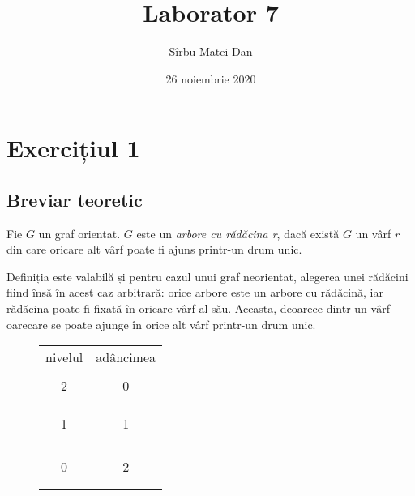 \documentclass[9pt,a4paper]{article}
\title{\bf Laborator 7}
\author{Sîrbu Matei-Dan}
\date{26 noiembrie 2020}
\begin{document}
\maketitle

\section*{Exercițiul 1}
\subsection*{Breviar teoretic}

{\color{black}Fie $G$ un graf orientat. $G$ este un \textit{arbore cu rădăcina r}, dacă există $G$ un vârf $r$ din care oricare alt vârf poate fi ajuns printr-un drum unic.

Definiția este valabilă și pentru cazul unui graf neorientat, alegerea unei rădăcini fiind însă în acest caz arbitrară: orice arbore este un arbore cu rădăcină, iar rădăcina poate fi fixată în oricare vârf al său. Aceasta, deoarece dintr-un vârf oarecare se poate ajunge în orice alt vârf printr-un drum unic.

\begin{figure}[htbp]
    \centering
    \begin{minipage}[t!]{0.3\textwidth}
        \begin{tabular}{cc}
            nivelul & adâncimea \\
                    &           \\
            2       & 0         \\
                    &           \\
                    &           \\
                    &           \\
            1       & 1         \\
                    &           \\
                    &           \\
                    &           \\
                    &           \\
            0       & 2         \\
                    &           \\
                    &           \\
        \end{tabular}
    \end{minipage}
    \begin{minipage}[t!]{0.65\textwidth}
\end{minipage}
\end{figure}}
\end{document}
